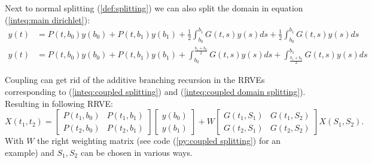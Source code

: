 \documentclass[a4paper,12pt]{article}
\begin{document}









\begin{example} \label{ex:coupled splitting}
    Next to normal splitting (\ref{def:splitting}) we can
    also split the domain in equation (\ref{inteq:main dirichlet}):
    \begin{align}\label{inteq:coupled splitting}
        y(t) & = P(t,b_{0}) y(b_{0}) + P(t,b_{1}) y(b_{1}) +
        \frac{1}{2} \int_{b_{0}}^{b_{1}} G(t,s)y(s) ds +
        \frac{1}{2} \int_{b_{0}}^{b_{1}} G(t,s)y(s) ds                                              \\
        y(t) & = P(t,b_{0}) y(b_{0}) + P(t,b_{1}) y(b_{1}) + \label{inteq:coupled domain splitting}
        \int_{b_{0}}^{\frac{b_{1}+b_{0}}{2}} G(t,s)y(s) ds +
        \int_{\frac{b_{1}+b_{0}}{2}}^{b_{1}} G(t,s)y(s) ds
    \end{align}

    Coupling can get rid of the additive branching recursion in the RRVEs corresponding
    to (\ref{inteq:coupled splitting}) and (\ref{inteq:coupled domain splitting}).
    Resulting in following RRVE:
    \begin{equation} \label{RRVE:coupled splitting}
        X(t_{1},t_{2})=
        \begin{bmatrix}
            P(t_{1},b_{0}) & P(t_{1},b_{1}) \\
            P(t_{2},b_{0}) & P(t_{2},b_{1})
        \end{bmatrix}
        \begin{bmatrix}
            y(b_{0}) \\
            y(b_{1})
        \end{bmatrix}
        +
        W
        \begin{bmatrix}
            G(t_{1},S_{1}) & G(t_{1},S_{2}) \\
            G(t_{2},S_{1}) & G(t_{2},S_{2})
        \end{bmatrix}
        X(S_{1},S_{2}).
    \end{equation}
    With $W$ the right weighting matrix (see code (\ref{py:coupled splitting}) for an example)
    and $S_{1},S_{2}$ can be chosen in various ways.
\end{example}
\end{document}
